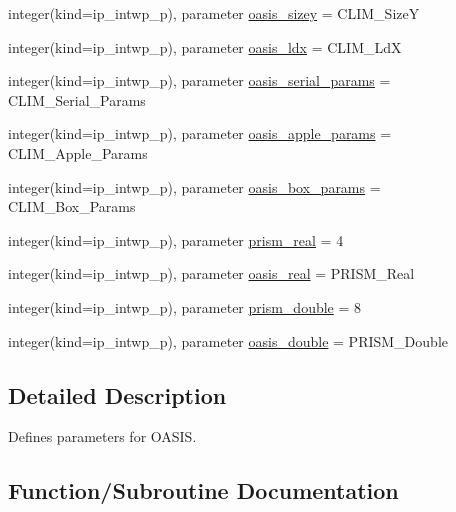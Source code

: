 \begin{DoxyCompactItemize}
integer(kind=ip\+\_\+intwp\+\_\+p), parameter \hyperlink{namespacemod__oasis__parameters_ac3441e0815500ea5d38d80a48c4c7474}{oasis\+\_\+sizey} = C\+L\+I\+M\+\_\+\+SizeY
\item 
integer(kind=ip\+\_\+intwp\+\_\+p), parameter \hyperlink{namespacemod__oasis__parameters_a70aa19a7931c1ef1a371fb9be8379421}{oasis\+\_\+ldx} = C\+L\+I\+M\+\_\+\+LdX
\item 
integer(kind=ip\+\_\+intwp\+\_\+p), parameter \hyperlink{namespacemod__oasis__parameters_a021091fc3ff43fdd8699d810bc18b6be}{oasis\+\_\+serial\+\_\+params} = C\+L\+I\+M\+\_\+\+Serial\+\_\+\+Params
\item 
integer(kind=ip\+\_\+intwp\+\_\+p), parameter \hyperlink{namespacemod__oasis__parameters_a4e80e06d524bff6a98d2dbb856d0b92d}{oasis\+\_\+apple\+\_\+params} = C\+L\+I\+M\+\_\+\+Apple\+\_\+\+Params
\item 
integer(kind=ip\+\_\+intwp\+\_\+p), parameter \hyperlink{namespacemod__oasis__parameters_a5796610110f6707828b7626f03ad93b3}{oasis\+\_\+box\+\_\+params} = C\+L\+I\+M\+\_\+\+Box\+\_\+\+Params
\item 
integer(kind=ip\+\_\+intwp\+\_\+p), parameter \hyperlink{namespacemod__oasis__parameters_a02e0627219e7769df37e3d55da46f65d}{prism\+\_\+real} = 4
\item 
integer(kind=ip\+\_\+intwp\+\_\+p), parameter \hyperlink{namespacemod__oasis__parameters_ae7760fcfae19d2f3cbf759688cd35193}{oasis\+\_\+real} = P\+R\+I\+S\+M\+\_\+\+Real
\item 
integer(kind=ip\+\_\+intwp\+\_\+p), parameter \hyperlink{namespacemod__oasis__parameters_a9527d2d640ea7d747143bf994ee9b206}{prism\+\_\+double} = 8
\item 
integer(kind=ip\+\_\+intwp\+\_\+p), parameter \hyperlink{namespacemod__oasis__parameters_a1071adbbf4c378907b4ff69dd53d0d7e}{oasis\+\_\+double} = P\+R\+I\+S\+M\+\_\+\+Double
\end{DoxyCompactItemize}


\subsection{Detailed Description}
Defines parameters for O\+A\+S\+IS. 

\subsection{Function/\+Subroutine Documentation}
\mbox{\label{namespacemod__oasis__parameters_abf6fb2dbeee19674bef02b0c1fc7dc2f}} 

